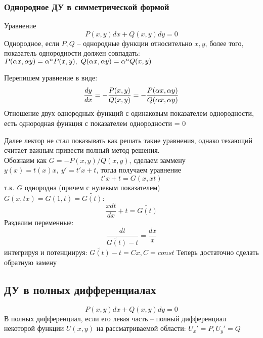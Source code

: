 \subsubsection{Однородное ДУ в симметрической формой}
\begin{Def}
Уравнение
\begin{equation}
     P(x , y) dx + Q(x, y) dy = 0
\end{equation}
Однородное, если $P, Q$ -- однородные функции относительно $x, y$, более того, показатель однородности должен совпадать: $P(\alpha x, \alpha y) = \alpha^n P(x, y ), ~ Q(\alpha x, \alpha y) = \alpha^n Q(x, y )$
\end{Def}
Перепишем уравнение в виде:
\begin{equation}
    \frac{dy}{dx} = - \frac{P(x, y)}{Q (x, y)} = - \frac{P( \alpha x, \alpha y)}{Q (\alpha x, \alpha y)}
\end{equation}
Отношение двух однородных функций с одинаковым показателем однородности, есть однородная функция с показателем однородности = 0 
\begin{note}
Далее лектор не стал показывать как решать такие уравнения, однако техающий считает важным привести полный метод решения. \\
Обознаим  как $G = - P (x, y) / Q(x, y)$, сделаем заммену $y(x) = t(x) x, ~ y' = t'x + t$, тогда получаем уравнение 
\begin{equation}
    t'x + t = G(x, xt)
\end{equation}
т.к. $G$ однородна (причем с нулевым показателем) $G(x, tx) = G(1, t) = \widetilde{G(t)}$:
\begin{equation}
\frac{x dt}{dx} + t = \widetilde{G(t)}
\end{equation}
Разделим переменные:
\begin{equation}
    \frac{dt}{\widetilde{G(t)} - t} = \frac{dx}{x}
\end{equation}
интегрируя и потенциируя: $\widetilde{G(t)} - t = Cx , C =const$ Теперь достаточно сделать обратную замену
\end{note}
\subsection{ДУ в полных дифференциалах}

\begin{Def} 
\begin{equation}
    P(x , y) dx + Q(x, y) dy = 0
\end{equation}
В полных дифференциал, если его левая часть -- полный дифференциал некоторой функции $U(x, y)$ на рассматриваемой области: $U_x ' = P, U_y ' = Q$
\end{Def}


